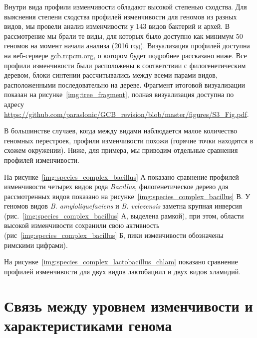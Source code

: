 Внутри вида профили изменчивости обладают высокой степенью сходства. Для выяснения степени сходства профилей изменчивости для геномов из разных видов, мы провели анализ изменчивости у 143 видов бактерий и архей. В рассмотрение мы брали те виды, для которых было доступно как минимум 50 геномов на момент начала анализа (2016 год). Визуализация профилей доступна на веб-сервере \url{gcb.rcpcm.org}, о котором будет подробнее рассказано ниже. Все профили изменчивости были расположены в соответствии с филогенетическим деревом, блоки синтении рассчитывались между всеми парами видов, расположенными последовательно на дереве. Фрагмент итоговой визуализации показан на рисунке~\ref{img:tree_fragment}, полная визуализация доступна по адресу \url{https://github.com/paraslonic/GCB_revision/blob/master/figures/S3_Fig.pdf}. 

В большинстве случаев, когда между видами наблюдается малое количество геномных перестроек, профили изменчивости похожи (горячие точки находятся в схожем окружении). Ниже, для примера, мы приводим отдельные сравнения профилей изменчивости.

На рисунке~\ref{img:species_complex_bacillus} А показано сравнение профилей изменчивости четырех видов рода \textit{Bacillus}, филогенетическое дерево для рассмотренных видов показано на рисунке~\ref{img:species_complex_bacillus} В. У геномов видов \textit{B. amyloliquefaciens} и \textit{B. velezensis} заметна крупная инверсия (рис.~\ref{img:species_complex_bacillus} А, выделена рамкой), при этом, области высокой изменчивости сохранили свою активность  (рис~\ref{img:species_complex_bacillus} Б, пики изменчивости обозначены римскими цифрами). 

На рисунке~\ref{img:species_complex_lactobacillus_chlam} показано сравнение профилей изменчивости для двух видов лактобацилл и двух видов хламидий.








\section{Связь между уровнем изменчивости и характеристиками генома}\label{chaptComplexWithSMTH}


